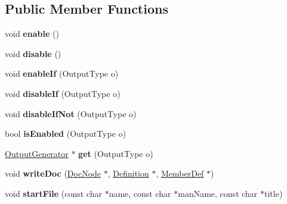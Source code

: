 \subsection*{Public Member Functions}
\begin{DoxyCompactItemize}
\item 
\mbox{\label{class_r_t_f_generator_adc782b62f471353f7b535052bd8e16c1}} 
void {\bfseries enable} ()
\item 
\mbox{\label{class_r_t_f_generator_aae28ca70077d65fd1b3dcd9ec9781e05}} 
void {\bfseries disable} ()
\item 
\mbox{\label{class_r_t_f_generator_a21f14b800414d41657e55e6e57fc66ef}} 
void {\bfseries enable\+If} (Output\+Type o)
\item 
\mbox{\label{class_r_t_f_generator_a35fbaedd73a1f52ea24a04199d8f415c}} 
void {\bfseries disable\+If} (Output\+Type o)
\item 
\mbox{\label{class_r_t_f_generator_a1c9164aa856f5977128a8253a1f64426}} 
void {\bfseries disable\+If\+Not} (Output\+Type o)
\item 
\mbox{\label{class_r_t_f_generator_a6bccbf01f966c68264db6a07ec459cb0}} 
bool {\bfseries is\+Enabled} (Output\+Type o)
\item 
\mbox{\label{class_r_t_f_generator_a24e81556aafd0e14948cd96f1dbefc46}} 
\mbox{\hyperlink{class_output_generator}{Output\+Generator}} $\ast$ {\bfseries get} (Output\+Type o)
\item 
\mbox{\label{class_r_t_f_generator_a0d8c73e39b915db738f68dddaf437370}} 
void {\bfseries write\+Doc} (\mbox{\hyperlink{class_doc_node}{Doc\+Node}} $\ast$, \mbox{\hyperlink{class_definition}{Definition}} $\ast$, \mbox{\hyperlink{class_member_def}{Member\+Def}} $\ast$)
\item 
\mbox{\label{class_r_t_f_generator_a8f2619c60318190461202909303cdd64}} 
void {\bfseries start\+File} (const char $\ast$name, const char $\ast$man\+Name, const char $\ast$title)

\end{DoxyCompactItemize}
